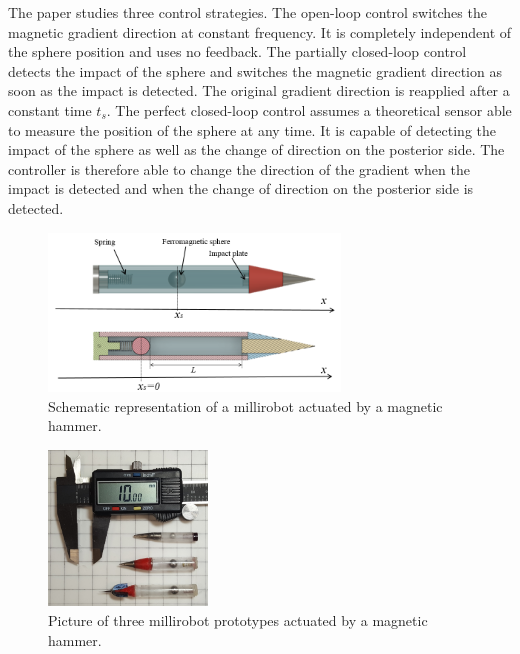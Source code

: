 \documentclass[letterpaper, 10 pt, journal, twoside]{ieeetran}
\begin{document}
The paper studies three control strategies. The open-loop control switches the magnetic gradient direction at constant frequency. It is completely independent of the sphere position and uses no feedback. The partially closed-loop control detects the impact of the sphere and switches the magnetic gradient direction as soon as the impact is detected. The original gradient direction is reapplied after a constant time $t_s$. The perfect closed-loop control assumes a theoretical sensor able to measure the position of the sphere at any time. It is capable of detecting the impact of the sphere as well as the change of direction on the posterior side. The controller is therefore able to change the direction of the gradient when the impact is detected and when the change of direction on the posterior side is detected.\par


\begin{figure}\centering
  \includegraphics[width=220pt]{figure1-2.png}
  \caption{Schematic representation of a millirobot actuated by a magnetic hammer.}
  \label{millirobot}
\end{figure}

\begin{figure}
\begin{centering}
  \includegraphics[width=120pt]{robots_prototypes.jpg}
  \caption{Picture of three millirobot prototypes actuated by a magnetic hammer.}
  \label{prototypes}
\end{centering}
\end{figure}
\end{document}
